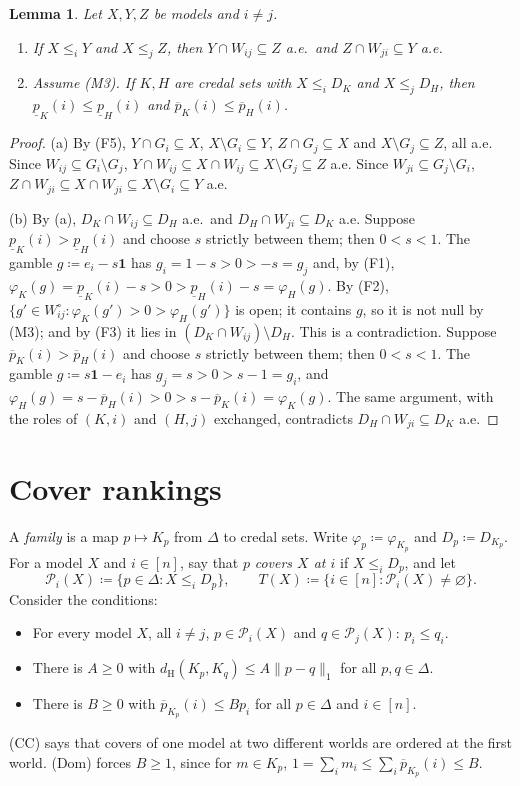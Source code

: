 \documentclass[11pt]{article}
\newtheorem{lemma}[theorem]{Lemma}
\theoremstyle{definition}
\newcommand{\one}{\mathbf 1}
\newcommand{\dH}{d_{\mathrm H}}
\newcommand{\Pc}{\mathcal P}
\newcommand{\lp}{\underline{p}}
\newcommand{\up}{\overline{p}}
\begin{document}
\begin{lemma}\label{lem:endpoints}
Let $X,Y,Z$ be models and $i\ne j$.
\begin{enumerate}[label=(\alph*)]
\item If $X\le_iY$ and $X\le_jZ$, then $Y\cap W_{ij}\subseteq Z$ a.e.\ and $Z\cap W_{ji}\subseteq Y$ a.e.
\item Assume (M3). If $K,H$ are credal sets with $X\le_iD_K$ and $X\le_jD_H$, then $\lp_K(i)\le\lp_H(i)$ and $\up_K(i)\le\up_H(i)$.
\end{enumerate}
\end{lemma}

\begin{proof}
(a) By (F5), $Y\cap G_i\subseteq X$, $X\setminus G_i\subseteq Y$, $Z\cap G_j\subseteq X$ and $X\setminus G_j\subseteq Z$, all a.e. Since $W_{ij}\subseteq G_i\setminus G_j$, $Y\cap W_{ij}\subseteq X\cap W_{ij}\subseteq X\setminus G_j\subseteq Z$ a.e. Since $W_{ji}\subseteq G_j\setminus G_i$, $Z\cap W_{ji}\subseteq X\cap W_{ji}\subseteq X\setminus G_i\subseteq Y$ a.e.

(b) By (a), $D_K\cap W_{ij}\subseteq D_H$ a.e.\ and $D_H\cap W_{ji}\subseteq D_K$ a.e. Suppose $\lp_K(i)>\lp_H(i)$ and choose $s$ strictly between them; then $0<s<1$. The gamble $g\coloneqq e_i-s\one$ has $g_i=1-s>0>-s=g_j$ and, by (F1), $\varphi_K(g)=\lp_K(i)-s>0>\lp_H(i)-s=\varphi_H(g)$. By (F2), $\{g'\in W^\circ_{ij}:\varphi_K(g')>0>\varphi_H(g')\}$ is open; it contains $g$, so it is not null by (M3); and by (F3) it lies in $(D_K\cap W_{ij})\setminus D_H$. This is a contradiction. Suppose $\up_K(i)>\up_H(i)$ and choose $s$ strictly between them; then $0<s<1$. The gamble $g\coloneqq s\one-e_i$ has $g_j=s>0>s-1=g_i$, and $\varphi_H(g)=s-\up_H(i)>0>s-\up_K(i)=\varphi_K(g)$. The same argument, with the roles of $(K,i)$ and $(H,j)$ exchanged, contradicts $D_H\cap W_{ji}\subseteq D_K$ a.e.
\end{proof}

\section{Cover rankings}\label{sec:cover}

A \emph{family} is a map $p\mapsto K_p$ from $\Delta$ to credal sets. Write $\varphi_p\coloneqq\varphi_{K_p}$ and $D_p\coloneqq D_{K_p}$. For a model $X$ and $i\in[n]$, say that $p$ \emph{covers $X$ at $i$} if $X\le_iD_p$, and let
\[
\Pc_i(X)\coloneqq\{p\in\Delta:X\le_iD_p\},\qquad T(X)\coloneqq\{i\in[n]:\Pc_i(X)\ne\varnothing\}.
\]
Consider the conditions:
\begin{itemize}[leftmargin=3.6em]
\item[\textbf{(CC)}] For every model $X$, all $i\ne j$, $p\in\Pc_i(X)$ and $q\in\Pc_j(X)$: $p_i\le q_i$.
\item[\textbf{(Lip)}] There is $A\ge0$ with $\dH(K_p,K_q)\le A\|p-q\|_1$ for all $p,q\in\Delta$.
\item[\textbf{(Dom)}] There is $B\ge0$ with $\up_{K_p}(i)\le Bp_i$ for all $p\in\Delta$ and $i\in[n]$.
\end{itemize}
(CC) says that covers of one model at two different worlds are ordered at the first world. (Dom) forces $B\ge1$, since for $m\in K_p$, $1=\sum_im_i\le\sum_i\up_{K_p}(i)\le B$.
\end{document}
